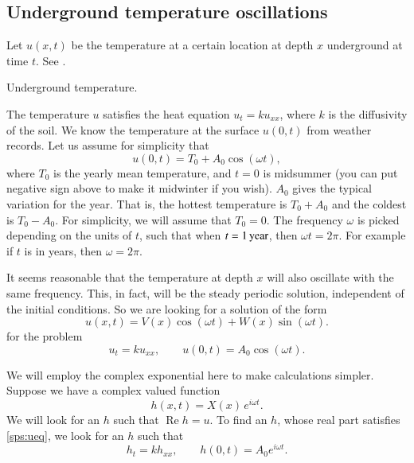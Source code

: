 \documentclass[12pt]{book}
\begin{document}
\subsection{Underground temperature oscillations}

Let $u(x,t)$ be the temperature at a certain location at depth $x$
underground at time $t$.  See .

\begin{diffyfloatingfigurer}{2.5in}{2.5in}
\capstart
\begin{center}
\caption{Underground temperature.\label{sps:groundtempfig}}
\end{center}
\end{diffyfloatingfigurer}

The temperature $u$ satisfies the heat equation $u_t = ku_{xx}$, where $k$
is the diffusivity of the soil.
We know the temperature at the surface $u(0,t)$ from weather
records.  Let us assume for simplicity that
\begin{equation*}
u(0,t) = T_0 + A_0 \cos (\omega t) ,
\end{equation*}
where $T_0$ is the yearly mean
temperature, and
$t=0$ is midsummer (you can put
negative sign above to make it midwinter if you wish).  $A_0$ gives 
the typical variation for the year.  That is,
the hottest temperature is $T_0 + A_0$ and the coldest is $T_0 - A_0$.
For simplicity, we will assume that $T_0 = 0$.
The frequency $\omega$ is picked depending on the units of $t$, such that
when $t=\unit[1]{year}$, then $\omega t = 2 \pi$.  For example if $t$ is
in years, then $\omega = 2\pi$.

It seems reasonable that the temperature at depth $x$ will also oscillate
with the same frequency.  This, in fact, will be the steady periodic
solution, independent of the initial conditions.
So we are looking for a solution of the form
\begin{equation*}
u(x,t) = V(x) \cos (\omega t) + W (x) \sin ( \omega t) .
\end{equation*}
for the problem
\begin{equation} \label{sps:ueq}
u_t = k u_{xx}, \qquad u(0,t) = A_0 \cos ( \omega t) .
\end{equation}

We will employ the complex exponential here to make calculations simpler.
Suppose we have a complex valued function
\begin{equation*}
h(x,t) = X(x)\, e^{i\omega t} .
\end{equation*}
We will look for an $h$ such that $\operatorname{Re} h = u$.
To find an $h$, whose real part satisfies \eqref{sps:ueq}, we look for
an $h$ such that
\begin{equation} \label{sps:heq}
h_t = k h_{xx}, \qquad h(0,t) = A_0 e^{i\omega t} .
\end{equation}
\end{document}
